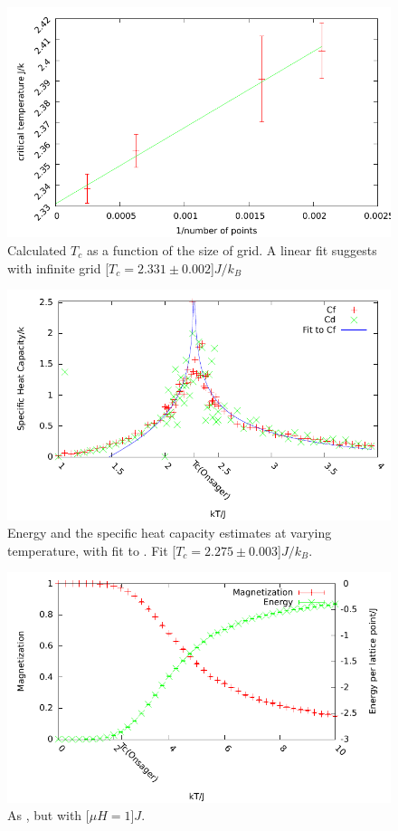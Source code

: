 \documentclass[12pt,a4paper,english]{article}
\begin{document}
\begin{figure}
\center
\includegraphics[width=\textwidth]{Optimized/tests/gridsize2.pdf}
\caption{Calculated $T_c$ as a function of the size of grid. A linear fit suggests with infinite grid \unit[$T_c=2.331\pm0.002$]{$J/k_B$}}\label{fig:gridsize}
\end{figure}

\begin{figure}
\center
\includegraphics[width=\textwidth]{Optimized/tests/heat2.pdf}
\caption{Energy and the specific heat capacity estimates at varying temperature, with fit to . Fit \unit[$T_c=2.275\pm0.003$]{$J/k_B$}.}\label{fig:heat}
\end{figure}

\begin{figure}
\center
\includegraphics[width=\textwidth]{Optimized/tests/mag1.pdf}
\caption{As , but with \unit[$\mu H = 1$]{$J$}.}\label{fig:magnetic-field}
\end{figure}
\end{document}
